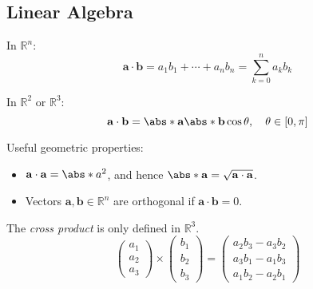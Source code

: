 \subsection{Linear Algebra}%
\label{sub:linear-algebra}

\begin{multicols}{2}

    \begin{CheatsheetEntryFrame}

         

        In $\mathbb{R}^n$:
        \begin{equation*}
            \mathbf{a} \cdot \mathbf{b} = a_1 b_1 + \cdots + a_n b_n = \sum_{k=0}^n{a_k b_k}
        \end{equation*}

        In $\mathbb{R}^2$ or $\mathbb{R}^3$:
        \begin{equation*}
            \mathbf{a} \cdot \mathbf{b} = \abs*{\mathbf{a}} \abs*{\mathbf{b}} \cos{\theta}
            ,\quad \theta \in [0, \pi]
        \end{equation*}

        Useful geometric properties:
        \begin{itemize}
            \item $\mathbf{a} \cdot \mathbf{a} = \abs*{a}^2$, and hence $\abs*{\mathbf{a}} = \sqrt{\mathbf{a} \cdot \mathbf{a}}$.
            \item Vectors $\mathbf{a}, \mathbf{b} \in \mathbb{R}^n$ are orthogonal if $\mathbf{a} \cdot \mathbf{b} = 0$.
        \end{itemize}

    \end{CheatsheetEntryFrame}

    \begin{CheatsheetEntryFrame}

         

        The \textit{cross product} is only defined in $\mathbb{R}^3$.
        \begin{equation*}
            \begin{pmatrix}
                a_1 \\
                a_2 \\
                a_3
            \end{pmatrix}
            \times
            \begin{pmatrix}
                b_1 \\
                b_2 \\
                b_3
            \end{pmatrix}
            =
            \begin{pmatrix}
                a_2 b_3 - a_3 b_2 \\
                a_3 b_1 - a_1 b_3 \\
                a_1 b_2 - a_2 b_1
            \end{pmatrix}
        \end{equation*}


\end{CheatsheetEntryFrame}
\end{multicols}
